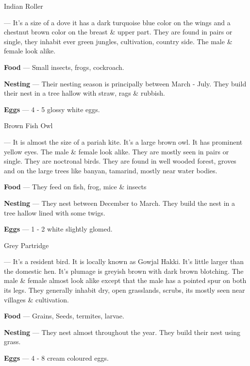 \begin{bird}{Indian Roller}

 --- It's a size of a dove it has a dark turquoise blue color on the wings and a chestnut brown color on the breast \& upper part. They are found in pairs or single, they inhabit ever green jungles, cultivation, country side. The male \& female look alike. 

{\large\bf Food} --- Small insects, frogs, cockroach.

{\large\bf Nesting} --- Their nesting season is principally between March - July. They build their nest in a tree hallow with straw, rags \& rubbish.

{\large\bf Eggs} --- 4 - 5 glossy white eggs. 
\end{bird}

\begin{bird}{Brown Fish Owl}

 --- It is almost the size of a pariah kite. It's a large brown owl. It has prominent yellow eyes. The male \& female look alike. They are mostly seen in pairs or single. They are noctronal birds. They are found in well wooded  forest, groves and on the large trees like banyan, tamarind, mostly near water bodies.

{\large\bf Food} --- They feed on fish, frog, mice \& insects

{\large\bf Nesting} --- They nest between December to March. They build the nest in a tree hallow lined with some twigs.

{\large\bf Eggs} --- 1 - 2 white slightly glomed.
\end{bird}

\begin{bird}{Grey Partridge}

 --- It's a resident bird. It is locally known as Gowjal Hakki. It's little larger than the domestic hen. It's plumage is greyish brown with dark brown blotching. The male \& female almost look alike except that the male has a pointed spur on both its legs. They generally inhabit dry, open grasslands, scrubs, its mostly seen near villages \& cultivation.

{\large\bf Food} --- Grains, Seeds, termites, larvae.

{\large\bf Nesting} --- They nest almost throughout the year. They build their nest using grass.

{\large\bf Eggs} --- 4 - 8 cream coloured eggs.
\end{bird}

